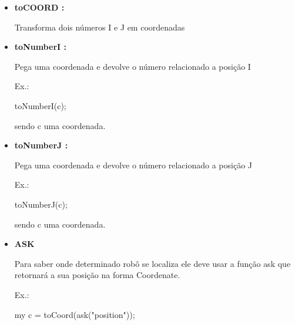 \documentclass[a4paper]{article}
\begin{document}
{{{{{\begin{itemize}
\begin{enumerate}
                        \ \ \ \ return x*j;
                        
                        \}
                
            \end{enumerate}
            
        \bigskip      
       
        \item \textbf{toCOORD :}
            
            Transforma dois números I e J em coordenadas
        
        \bigskip      
        
        \item \textbf{toNumberI :}
            
            Pega uma coordenada e devolve o número relacionado
            a posição I
            
            \textcolor{NavyBlue}{Ex.:}
            
            toNumberI(c);
            
            sendo c uma coordenada.
            
        \bigskip
        
        \item \textbf{toNumberJ :}
            
            Pega uma coordenada e devolve o número relacionado
            a posição J
            
            \textcolor{NavyBlue}{Ex.:}
            
            toNumberJ(c);
            
            sendo c uma coordenada.
            
       
       
\newpage %
        
         
        \item \textbf{ASK}
        
            Para saber onde determinado robô se localiza
            ele deve usar a função 
            \textcolor{NavyBlue}{ask} 
            que retornará a sua posição na forma
            Coordenate.
        
            \textcolor{NavyBlue}{Ex.:}
        
            my c = toCoord(ask("position"));
        
        \bigskip
        

\end{itemize}}}}}}
\end{document}
